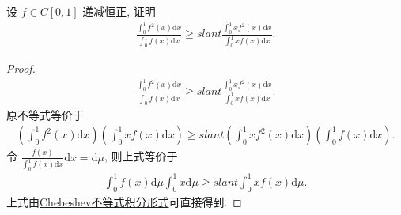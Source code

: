 \documentclass[../../main.tex]{subfiles}
\begin{document}
\begin{example}
设 $f \in C[0,1]$ 递减恒正, 证明
\begin{align*}
\frac{\int_0^1 f^2(x)\mathrm{d}x}{\int_0^1 f(x)\mathrm{d}x} \geqslant slant \frac{\int_0^1 xf^2(x)\mathrm{d}x}{\int_0^1 xf(x)\mathrm{d}x}.
\end{align*}
\end{example}
\begin{proof}
\begin{align*}
\frac{\int_0^1 f^2(x)\mathrm{d}x}{\int_0^1 f(x)\mathrm{d}x} \geqslant slant \frac{\int_0^1 xf^2(x)\mathrm{d}x}{\int_0^1 xf(x)\mathrm{d}x}.
\end{align*}
原不等式等价于
\begin{align*}
\left(\int_0^1 f^2(x)\mathrm{d}x\right)\left(\int_0^1 xf(x)\mathrm{d}x\right) \geqslant slant \left(\int_0^1 xf^2(x)\mathrm{d}x\right)\left(\int_0^1 f(x)\mathrm{d}x\right).
\end{align*}
令 $\frac{f(x)}{\int_0^1 f(x)\mathrm{d}x}\mathrm{d}x = \mathrm{d}\mu$, 则上式等价于
\begin{align*}
\int_0^1 f(x)\mathrm{d}\mu \int_0^1 x\mathrm{d}\mu \geqslant slant \int_0^1 xf(x)\mathrm{d}\mu.
\end{align*}
上式由\hyperref[Chebeshev不等式积分形式]{Chebeshev不等式积分形式}可直接得到. 
\end{proof}
\end{document}
